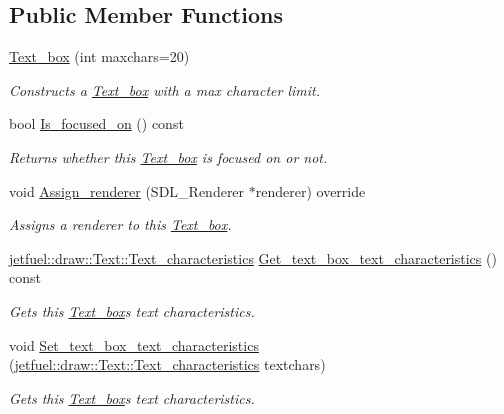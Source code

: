 \subsection*{Public Member Functions}
\begin{DoxyCompactItemize}
\item 
\hyperlink{classjetfuel_1_1gui_1_1Text__box_ac369a374d4f6d83029bc2536ada96b1b}{Text\+\_\+box} (int maxchars=20)
\begin{DoxyCompactList}\small\item\em Constructs a \hyperlink{classjetfuel_1_1gui_1_1Text__box}{Text\+\_\+box} with a max character limit. \end{DoxyCompactList}\item 
bool \hyperlink{classjetfuel_1_1gui_1_1Text__box_ab98bbc61a1355002c5f92e52ecd986ea}{Is\+\_\+focused\+\_\+on} () const
\begin{DoxyCompactList}\small\item\em Returns whether this \hyperlink{classjetfuel_1_1gui_1_1Text__box}{Text\+\_\+box} is focused on or not. \end{DoxyCompactList}\item 
void \hyperlink{classjetfuel_1_1gui_1_1Text__box_ad387deeeb41a04ab4fc34a48ba5ed910}{Assign\+\_\+renderer} (S\+D\+L\+\_\+\+Renderer $\ast$renderer) override
\begin{DoxyCompactList}\small\item\em Assigns a renderer to this \hyperlink{classjetfuel_1_1gui_1_1Text__box}{Text\+\_\+box}. \end{DoxyCompactList}\item 
\hyperlink{structjetfuel_1_1draw_1_1Text_1_1Text__characteristics}{jetfuel\+::draw\+::\+Text\+::\+Text\+\_\+characteristics} \hyperlink{classjetfuel_1_1gui_1_1Text__box_af052edf74fc28496f2d77e9d86b1c67a}{Get\+\_\+text\+\_\+box\+\_\+text\+\_\+characteristics} () const
\begin{DoxyCompactList}\small\item\em Gets this \hyperlink{classjetfuel_1_1gui_1_1Text__box}{Text\+\_\+box}\textquotesingle{}s text characteristics. \end{DoxyCompactList}\item 
void \hyperlink{classjetfuel_1_1gui_1_1Text__box_acec015bad50abfe391879139dbd5363c}{Set\+\_\+text\+\_\+box\+\_\+text\+\_\+characteristics} (\hyperlink{structjetfuel_1_1draw_1_1Text_1_1Text__characteristics}{jetfuel\+::draw\+::\+Text\+::\+Text\+\_\+characteristics} textchars)
\begin{DoxyCompactList}\small\item\em Gets this \hyperlink{classjetfuel_1_1gui_1_1Text__box}{Text\+\_\+box}\textquotesingle{}s text characteristics. \end{DoxyCompactList}\item 

\end{DoxyCompactItemize}
